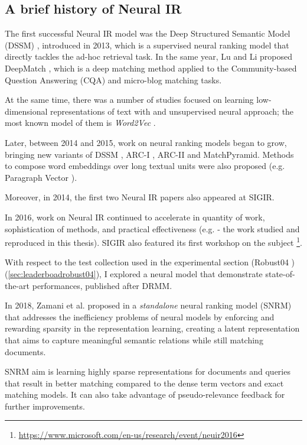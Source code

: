 \subsection{A brief history of Neural IR}
\label{ssec:historyNeuIR}

The first successful Neural IR model was the Deep Structured Semantic Model (DSSM) \cite{dssm}, introduced in 2013, which is a supervised neural ranking model that  directly  tackles  the  ad-hoc  retrieval  task. In the same year, Lu and Li proposed DeepMatch \cite{deepmatch}, which is a deep matching method applied  to the Community-based Question Answering (CQA) and micro-blog matching tasks.

At the same time, there was a number of studies focused on learning low-dimensional representations of text with and unsupervised neural approach; the most known model of them is \textit{Word2Vec} \cite{w2v}.

Later, between 2014 and 2015, work on neural ranking models began to grow, bringing new variants of DSSM \cite{cdssm}, ARC-I \cite{arc}, ARC-II and MatchPyramid. Methods to compose word embeddings over long textual units were also proposed (e.g. Paragraph Vector \cite{pv}).

Moreover, in 2014, the first two Neural IR papers also appeared at SIGIR.

In 2016, work on Neural IR continued to accelerate in quantity of work, sophistication of methods, and practical effectiveness (e.g. \cite{drmm} - the work studied and reproduced in this thesis). SIGIR also featured its first workshop on the subject \footnote{\url{https://www.microsoft.com/en-us/research/event/neuir2016}}.

With respect to the test collection used in the experimental section (Robust04 \cite{rob04}) (\ref{sec:leaderboadrobust04}), I explored a neural model that demonstrate state-of-the-art performances, published after DRMM.

In 2018, Zamani et al. proposed in \cite{stdlnneur} a \textit{standalone} neural ranking model (SNRM) that addresses the inefficiency problems of neural models by enforcing and rewarding sparsity in the representation learning, creating a latent representation that aims to capture meaningful semantic relations while still matching documents.

SNRM aim is learning highly sparse representations for documents and queries that result in better matching compared to the dense term vectors and exact matching models. It can also take advantage of pseudo-relevance feedback for further improvements.

